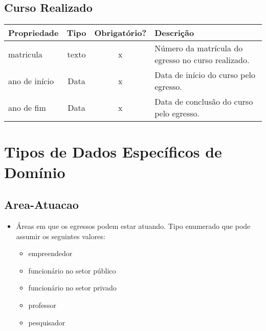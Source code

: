 \subsection{Curso Realizado} \label{Curso-Realizado}
\begin{table}[h!]
	\footnotesize
	\begin{tabular}{|p{2.6cm}|c|c|p{7.8cm}|}   \hline \rowcolor[rgb]{0.8,0.8,0.8}
	
		
 		\textbf{Propriedade} & \textbf{Tipo} & \textbf{Obrigatório?} & \centerline{\textbf{Descrição}} \\\hline 
 		                            
		matricula & texto & x & Número da matrícula do egresso no curso realizado. \\\hline 
		
		ano de início & Data & x & Data de início do curso pelo egresso. \\\hline 
		                             
		ano de fim & Data & x & Data de conclusão do curso pelo egresso. \\\hline 
	
		
	\end{tabular}	
\end{table}


\newpage

\section{Tipos de Dados Específicos de Domínio}

\subsection{Area-Atuacao} \label{Area-Atuacao}
	
	\begin{itemize}[noitemsep]
		\item Áreas em que os egressos podem estar atuando. Tipo enumerado que pode assumir os seguintes valores:
		\begin{itemize}[noitemsep]
  			\item empreendedor
  			\item funcionário no setor público
  			\item funcionário no setor privado
  			\item professor
  			\item pesquisador
		\end{itemize}
	\end{itemize}



